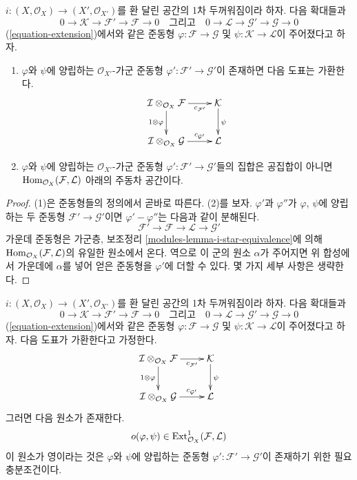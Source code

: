\begin{lemma}
\label{lemma-inf-map}
$i:(X,\mathcal{O}_X)\to(X',\mathcal{O}_{X'})$를 환 달린 공간의
1차 두꺼워짐이라 하자. 다음 확대들과
$$
0 \to \mathcal{K} \to \mathcal{F}' \to \mathcal{F} \to 0
\quad\text{그리고}\quad
0 \to \mathcal{L} \to \mathcal{G}' \to \mathcal{G} \to 0
$$
(\ref{equation-extension})에서와 같은 준동형
$\varphi:\mathcal{F}\to\mathcal{G}$ 및
$\psi:\mathcal{K}\to\mathcal{L}$이 주어졌다고 하자.
\begin{enumerate}
\item $\varphi$와 $\psi$에 양립하는 $\mathcal{O}_{X'}$-가군 준동형
$\varphi':\mathcal{F}'\to\mathcal{G}'$이 존재하면 다음 도표는 가환한다.
$$
\xymatrix{
\mathcal{I} \otimes_{\mathcal{O}_X} \mathcal{F}
\ar[r]_-{c_{\mathcal{F}'}} \ar[d]_{1 \otimes \varphi} &
\mathcal{K} \ar[d]^\psi \\
\mathcal{I} \otimes_{\mathcal{O}_X} \mathcal{G}
\ar[r]^-{c_{\mathcal{G}'}} &
\mathcal{L}
}
$$
\item $\varphi$와 $\psi$에 양립하는 $\mathcal{O}_{X'}$-가군 준동형
$\varphi':\mathcal{F}'\to\mathcal{G}'$들의 집합은 공집합이 아니면
$\mathop{\mathrm{Hom}}\nolimits_{\mathcal{O}_X}(\mathcal{F},\mathcal{L})$ 아래의 주동차 공간이다.
\end{enumerate}
\end{lemma}

\begin{proof}
(1)은 준동형들의 정의에서 곧바로 따른다. (2)를 보자.
$\varphi'$과 $\varphi''$가 $\varphi$, $\psi$에 양립하는 두 준동형
$\mathcal{F}'\to\mathcal{G}'$이면 $\varphi'-\varphi''$는 다음과 같이
분해된다.
$$
\mathcal{F}' \to \mathcal{F} \to \mathcal{L} \to \mathcal{G}'
$$
가운데 준동형은 가군층, 보조정리
\ref{modules-lemma-i-star-equivalence}에 의해
$\mathop{\mathrm{Hom}}\nolimits_{\mathcal{O}_X}(\mathcal{F},\mathcal{L})$의 유일한 원소에서 온다.
역으로 이 군의 원소 $\alpha$가 주어지면 위 합성에서 가운데에
$\alpha$를 넣어 얻은 준동형을 $\varphi'$에 더할 수 있다.
몇 가지 세부 사항은 생략한다.
\end{proof}

\begin{lemma}
\label{lemma-inf-obs-map}
$i:(X,\mathcal{O}_X)\to(X',\mathcal{O}_{X'})$를 환 달린 공간의
1차 두꺼워짐이라 하자. 다음 확대들과
$$
0 \to \mathcal{K} \to \mathcal{F}' \to \mathcal{F} \to 0
\quad\text{그리고}\quad
0 \to \mathcal{L} \to \mathcal{G}' \to \mathcal{G} \to 0
$$
(\ref{equation-extension})에서와 같은 준동형
$\varphi:\mathcal{F}\to\mathcal{G}$ 및
$\psi:\mathcal{K}\to\mathcal{L}$이 주어졌다고 하자. 다음 도표가
가환한다고 가정한다.
$$
\xymatrix{
\mathcal{I} \otimes_{\mathcal{O}_X} \mathcal{F}
\ar[r]_-{c_{\mathcal{F}'}} \ar[d]_{1 \otimes \varphi} &
\mathcal{K} \ar[d]^\psi \\
\mathcal{I} \otimes_{\mathcal{O}_X} \mathcal{G}
\ar[r]^-{c_{\mathcal{G}'}} &
\mathcal{L}
}
$$
그러면 다음 원소가 존재한다.
$$
o(\varphi, \psi) \in
\mathop{\mathrm{Ext}}\nolimits^1_{\mathcal{O}_X}(\mathcal{F}, \mathcal{L})
$$
이 원소가 영이라는 것은 $\varphi$와 $\psi$에 양립하는 준동형
$\varphi':\mathcal{F}'\to\mathcal{G}'$이 존재하기 위한 필요충분조건이다.
\end{lemma}

